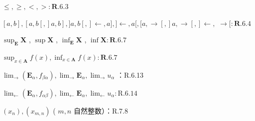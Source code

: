 \(\leqslant, \geqslant, <, > : \mathbf{R}.6.3\)

\([a, b], [a, b[, ]a, b], ]a, b[, ] \leftarrow, a], ] \leftarrow, a[, [a, \rightarrow [, ]a, \rightarrow [, ] \leftarrow,\) \(\rightarrow[: \mathbf{R}.6.4\)

\(\sup_{\mathbf{E}} \mathbf{X}\) , \(\sup \mathbf{X}\) , \(\inf_{\mathbf{E}} \mathbf{X}\) , \(\inf \mathbf{X} : \mathbf{R}.6.7\)

\(\sup_{x \in \mathbf{A}} f(x), \inf_{x \in \mathbf{A}} f(x): \mathbf{R}.6.7\)

\(\lim_{\rightarrow} (\mathbf{E}_{\alpha}, f_{\beta \alpha}), \lim_{\rightarrow} \mathbf{E}_{\alpha}, \lim_{\rightarrow} u_{\alpha}\) ：R.6.13

\(\lim_{\leftarrow} (\mathbf{E}_{\alpha}, f_{\alpha \beta}), \lim_{\leftarrow} \mathbf{E}_{\alpha}, \lim_{\leftarrow} u_{\alpha}: \text{R.6.14}\)

\((x_{n}), (x_{m,n})\) ( \(m, n\) 自然整数）：R.7.8

